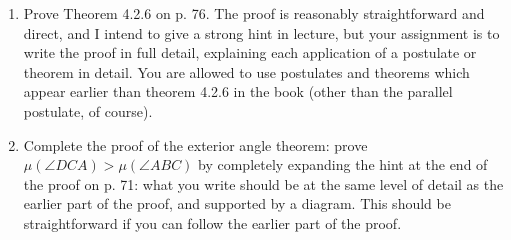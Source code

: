 \documentclass[12pt]{article}
\begin{document}
\begin{enumerate}
\item  Prove Theorem 4.2.6 on p. 76.  The proof is reasonably straightforward and direct, and I intend to give a strong hint in lecture, but your assignment is to write the proof in full detail,
explaining each application of a postulate or theorem in detail.  You are allowed to use postulates and theorems which appear earlier than theorem 4.2.6 in the book (other than the parallel postulate, of course).

\item  Complete the proof of the exterior angle theorem:  prove $\mu(\angle DCA) > \mu(\angle ABC)$ by completely expanding the hint at the end of the proof on p. 71:  what you write should be at the same level of detail as the earlier part of the proof, and supported by a diagram.  This should be straightforward if you can follow the earlier part of the proof.

\end{enumerate}
\end{document}
